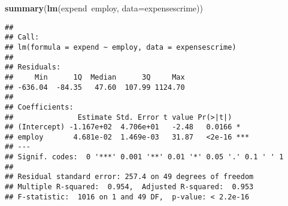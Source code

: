 \documentclass[11pt,]{article}
\newenvironment{Shaded}{\begin{snugshade}}{\end{snugshade}}
\newcommand{\KeywordTok}[1]{\textcolor[rgb]{0.13,0.29,0.53}{\textbf{{#1}}}}
\newcommand{\DataTypeTok}[1]{\textcolor[rgb]{0.13,0.29,0.53}{{#1}}}
\newcommand{\NormalTok}[1]{{#1}}
\begin{document}
\begin{Shaded}
\begin{Highlighting}[]
\KeywordTok{summary}\NormalTok{(}\KeywordTok{lm}\NormalTok{(expend~employ, }\DataTypeTok{data=}\NormalTok{expensescrime))}
\end{Highlighting}
\end{Shaded}

\begin{verbatim}
## 
## Call:
## lm(formula = expend ~ employ, data = expensescrime)
## 
## Residuals:
##     Min      1Q  Median      3Q     Max 
## -636.04  -84.35   47.60  107.99 1124.70 
## 
## Coefficients:
##               Estimate Std. Error t value Pr(>|t|)    
## (Intercept) -1.167e+02  4.706e+01   -2.48   0.0166 *  
## employ       4.681e-02  1.469e-03   31.87   <2e-16 ***
## ---
## Signif. codes:  0 '***' 0.001 '**' 0.01 '*' 0.05 '.' 0.1 ' ' 1
## 
## Residual standard error: 257.4 on 49 degrees of freedom
## Multiple R-squared:  0.954,  Adjusted R-squared:  0.953 
## F-statistic:  1016 on 1 and 49 DF,  p-value: < 2.2e-16
\end{verbatim}
\end{document}
